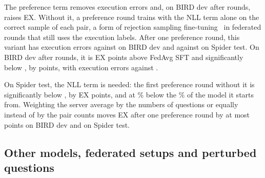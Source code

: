 The preference term removes execution errors and, on BIRD dev after
 rounds, raises EX. Without it, a preference round trains with the NLL term alone on the
correct sample of each pair, a form of rejection sampling
fine-tuning~\cite{yuan2023rft} in federated rounds that still uses the
execution labels. After one preference round, this variant has
 execution errors against  on BIRD
dev and  against  on Spider
test. On BIRD dev after  rounds, it is
 EX points above FedAvg SFT and
significantly below \method{}, by  points, with
 execution errors against .

On Spider test, the NLL term is needed: the first preference round
without it is significantly below \method{}, by
 EX points, and at
\% below the \% of the model
it starts from. Weighting the server average by the numbers of questions or equally instead of by the pair
counts moves EX after one preference round by at most
 points on BIRD dev and
 on Spider test.

\subsection{Other models, federated setups and perturbed questions}\label{sec:breadth}\label{sec:perturbed}

\begin{table}[!ht]
\caption{EX (\%) on Spider test of three models after
 rounds in the main setup: the pretrained model
(No training), FedAvg SFT and \method. $\Delta$ and $p$ compare
\method{} with FedAvg SFT, as in Table~\ref{tab:main}.}\label{tab:models}
\footnotesize

\end{table}

\begin{table}[!ht]
\caption{EX (\%) of FedAvg SFT and \method{} after 
rounds in the federated setups of Table~\ref{tab:setups}, each evaluated
on the evaluation set of its benchmark. $\Delta$ and $p$ as in
Table~\ref{tab:main}.}\label{tab:federated}
\footnotesize

\end{table}

\begin{table}[!ht]
\caption{EX and TS (\%) on Spider dev and the three sets built from
Spider after  rounds. TS uses the official suite of
the Spider dev databases, and Spider-DK has none. The lower part gives
$\Delta$ and $p$ of \method{} against FedAvg SFT and against \method{}
without warm-up rounds, as in Table~\ref{tab:main}.}\label{tab:robust}
\footnotesize

\end{table}

